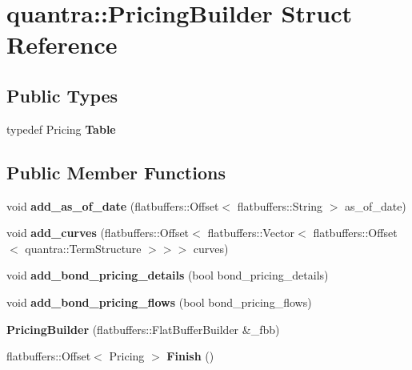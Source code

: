 \hypertarget{structquantra_1_1PricingBuilder}{}\section{quantra\+:\+:Pricing\+Builder Struct Reference}
\label{structquantra_1_1PricingBuilder}
\subsection*{Public Types}
\begin{DoxyCompactItemize}
\item 
\mbox{\label{structquantra_1_1PricingBuilder_ac7d8ef022e3733e2cfb327d75b3d6542}} 
typedef Pricing {\bfseries Table}
\end{DoxyCompactItemize}
\subsection*{Public Member Functions}
\begin{DoxyCompactItemize}
\item 
\mbox{\label{structquantra_1_1PricingBuilder_a97ab33f4e231a2f7a11e9d7f0bb2d546}} 
void {\bfseries add\+\_\+as\+\_\+of\+\_\+date} (flatbuffers\+::\+Offset$<$ flatbuffers\+::\+String $>$ as\+\_\+of\+\_\+date)
\item 
\mbox{\label{structquantra_1_1PricingBuilder_a48c08ba4bc0b245a8ddf50c7765d01c3}} 
void {\bfseries add\+\_\+curves} (flatbuffers\+::\+Offset$<$ flatbuffers\+::\+Vector$<$ flatbuffers\+::\+Offset$<$ quantra\+::\+Term\+Structure $>$$>$$>$ curves)
\item 
\mbox{\label{structquantra_1_1PricingBuilder_a1344238cd400066994df2471e2a65f77}} 
void {\bfseries add\+\_\+bond\+\_\+pricing\+\_\+details} (bool bond\+\_\+pricing\+\_\+details)
\item 
\mbox{\label{structquantra_1_1PricingBuilder_a4875ccf0ddb9c1c360fad7e3d9f355fd}} 
void {\bfseries add\+\_\+bond\+\_\+pricing\+\_\+flows} (bool bond\+\_\+pricing\+\_\+flows)
\item 
\mbox{\label{structquantra_1_1PricingBuilder_ac9b6ffcaf7c7465fd949a412071d3ad2}} 
{\bfseries Pricing\+Builder} (flatbuffers\+::\+Flat\+Buffer\+Builder \&\+\_\+fbb)
\item 
\mbox{\label{structquantra_1_1PricingBuilder_aa01dc02824e3fde75d4e3fa866b8d5e3}} 
flatbuffers\+::\+Offset$<$ Pricing $>$ {\bfseries Finish} ()
\end{DoxyCompactItemize}
